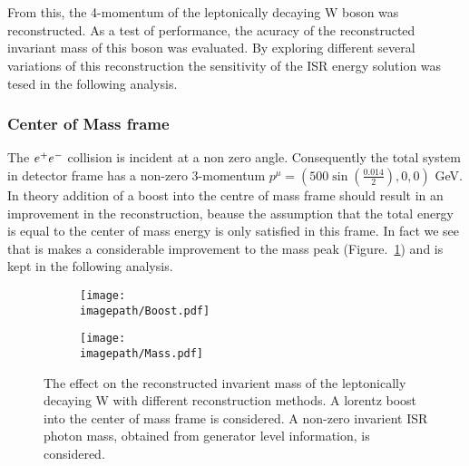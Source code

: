 \\\\
From this, the 4-momentum of the leptonically decaying W boson was reconstructed. As a test of performance, the acuracy of the reconstructed invariant mass of this boson was evaluated. By exploring different several variations of this reconstruction the sensitivity of the ISR energy solution was tesed in the following analysis.

\subsubsection{Center of Mass frame}
\label{SUBSUBSEC:CenterOfMassFrame}
The $e^{+}e^{-}$ collision is incident at a non zero angle. Consequently the total system in detector frame has a non-zero 3-momentum $ {p}^{\mu} = ( 500 \sin{(\frac{0.014}{2})}, 0, 0 )$ GeV. In theory addition of a boost into the centre of mass frame should result in an improvement in the reconstruction, beause the assumption that the total energy is equal to the center of mass energy is only satisfied in this frame. In fact we see that is makes a considerable improvement to the mass peak (Figure.~\ref{SUBFIG:Boost}) and is kept in the following analysis.

\begin{figure}[!]
  \centering
  \begin{subfigure}[t]{0.45\textwidth}
    \centering
    \texttt{[image: \\imagepath/Boost.pdf]}
    \caption{}
    \label{SUBFIG:Boost}
  \end{subfigure}
  \begin{subfigure}[t]{0.45\textwidth}
    \centering
    \texttt{[image: \\imagepath/Mass.pdf]}
    \caption{}
    \label{SUBFIG:MassFig}
  \end{subfigure}
  \caption{
    The effect on the reconstructed invarient mass of the leptonically decaying W with different reconstruction methods.
     A lorentz boost into the center of mass frame is considered.
     A non-zero invarient ISR photon mass, obtained from generator level information, is considered.
    }
  \label{FIG:BoostMass}
\end{figure}

